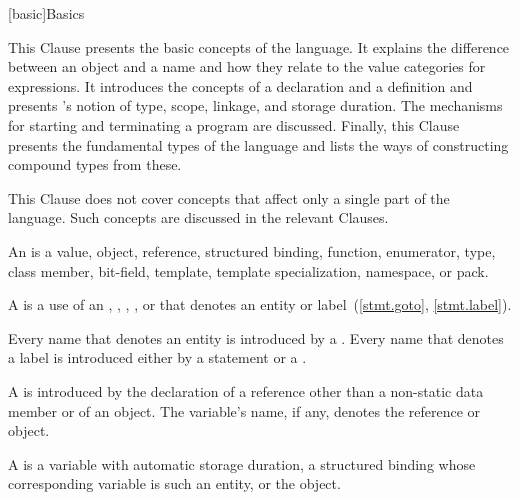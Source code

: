 [basic]{Basics}


\pnum
\begin{note} This Clause presents the basic concepts of the \Cpp{} language.
It explains the difference between an object and a
name and how they relate to the value categories for expressions.
It introduces the concepts of a
declaration and a definition and presents \Cpp{}'s
notion of type, scope, linkage, and
storage duration. The mechanisms for starting and
terminating a program are discussed. Finally, this Clause presents the
fundamental types of the language and lists the ways of constructing
compound types from these.\end{note}

\pnum
\begin{note} This Clause does not cover concepts that affect only a single
part of the language. Such concepts are discussed in the relevant
Clauses. \end{note}

\pnum
{}%
%
%
%
%
%
An  is a value, object, reference,
structured binding,
function, enumerator, type,
class member, bit-field, template, template specialization, namespace, or
pack.

\pnum
A  is a use of an ,
,
,
, or
 that denotes an entity or
label~(\ref{stmt.goto}, \ref{stmt.label}).

\pnum
Every name that denotes an entity is introduced by a
. Every name that denotes a label is introduced
either by a  statement or a
.

\pnum
A  is introduced by the
declaration of
a reference other than a non-static data member or of
an object. The variable's name, if any, denotes the reference or object.

\pnum
A  is a variable with
automatic storage duration,
a structured binding
whose corresponding variable is such an entity,
or the  object.

